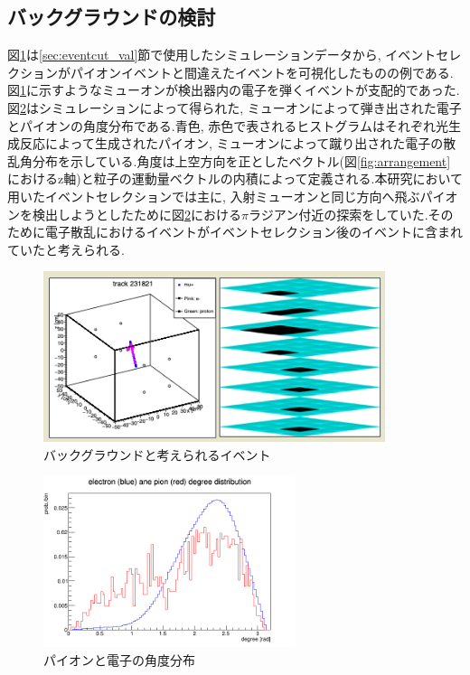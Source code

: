 \subsection{バックグラウンドの検討}\label{sec:anal:background}
図\ref{fig:anal:bg01}は\ref{sec:eventcut_val}節で使用したシミュレーションデータから, イベントセレクションがパイオンイベントと間違えたイベントを可視化したものの例である.図\ref{fig:anal:bg01}に示すようなミューオンが検出器内の電子を弾くイベントが支配的であった.図\ref{fig:pion_electron_degrere}はシミュレーションによって得られた, ミューオンによって弾き出された電子とパイオンの角度分布である.青色, 赤色で表されるヒストグラムはそれぞれ光生成反応によって生成されたパイオン, ミューオンによって蹴り出された電子の散乱角分布を示している.角度は上空方向を正としたベクトル(図\ref{fig:arrangement}におけるz軸)と粒子の運動量ベクトルの内積によって定義される.本研究において用いたイベントセレクションでは主に, 入射ミューオンと同じ方向へ飛ぶパイオンを検出しようとしたために図\ref{fig:pion_electron_degrere}における$\pi$ラジアン付近の探索をしていた.そのために電子散乱におけるイベントがイベントセレクション後のイベントに含まれていたと考えられる.
\begin{figure}[H]
    \centering
    \includegraphics[height=5.0cm]{img/anal_bg01.png}
    \caption{バックグラウンドと考えられるイベント}
    \label{fig:anal:bg01}
\end{figure}
\begin{figure}[H]
    \centering
    \includegraphics[height=5.0cm]{img/pi_e_degree.png}
    \caption{パイオンと電子の角度分布}
    \label{fig:pion_electron_degrere}
\end{figure}